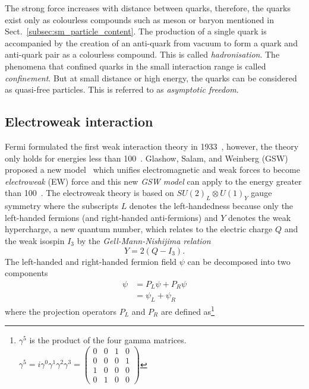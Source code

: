 The strong force increases with distance between quarks, therefore, the quarks exist only as colourless compounds such as meson or baryon mentioned in Sect.~\ref{subsec:sm_particle_content}.
The production of a single quark is accompanied by the creation of an anti-quark from vacuum to form a quark and anti-quark pair as a colourless compound.
This is called \textit{hadronisation}.
The phenomena that confined quarks in the small interaction range is called \textit{confinement}.
But at small distance or high energy, the quarks can be considered as quasi-free particles.
This is referred to as \textit{asymptotic freedom}.


\subsection{Electroweak interaction}
\label{subsec:sm_ewk_interaction}
Fermi formulated the first weak interaction theory in 1933~\cite{Fermi:1934hr}, however, the theory only holds for energies less than 100~{\GeV}.
Glashow, Salam, and Weinberg (GSW) proposed a new model~\cite{Salam:1968rm, Weinberg:1967tq, Glashow:1961tr} which unifies electromagnetic and weak forces to become \textit{electroweak} (EW) force and this new \textit{GSW model} can apply to the energy greater than 100~{\GeV}.
The electroweak theory is based on $SU(2)_{L} \otimes U(1)_{Y}$ gauge symmetry where the subscripts $L$ denotes the left-handedness because only the left-handed fermions (and right-handed anti-fermions) and $Y$ denotes the weak hypercharge, a new quantum number, which relates to the electric charge $Q$ and the weak isospin $I_{3}$ by the \textit{Gell-Mann-Nishijima relation}~\cite{Nakano:1953zz, Gell-Mann:1956iqa}
%
\begin{equation}
    Y = 2(Q - I_{3}).
    \label{eq:sm_hypercharge}
\end{equation}
%
The left-handed and right-handed fermion field $\psi$ can be decomposed into two components
%
\begin{align}
    \psi & = P_{L}\psi + P_{R}\psi\\
         & = \psi_{L} + \psi_{R}
    \label{eq:sm_fermion_field_components}
\end{align}
%
where the projection operators $P_{L}$ and $P_{R}$ are defined as\footnote{$\gamma^{5}$ is the product of the four gamma matrices. $\gamma^{5} = i \gamma^{0} \gamma^{1} \gamma^{2} \gamma^{3} = \left(\begin{matrix}0 & 0 & 1 & 0\\0 & 0 & 0 & 1\\1 & 0 & 0 & 0\\0 & 1 & 0 & 0\end{matrix}\right)$}
